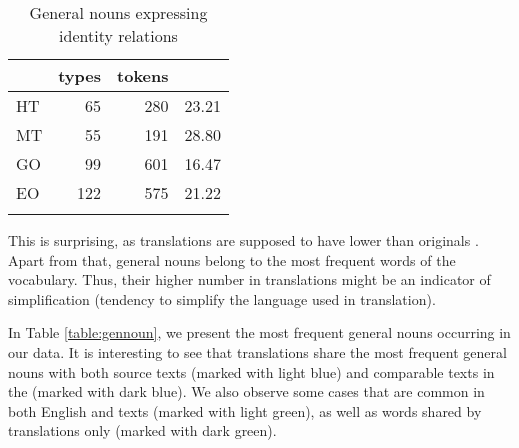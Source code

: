 \documentclass[output=paper]{langsci/langscibook.cls}
\begin{document}
\begin{table}
\begin{tabular}{lrrr}
\lsptoprule
	&	types&tokens&\isi{TTR}\\
\midrule
HT & 65  & 280 & 23.21\\
MT & 55    & 191 & 28.80\\
GO & 99  & 601 & 16.47\\
EO & 122 & 575 & 21.22\\
\lspbottomrule
\end{tabular}
\caption{General nouns expressing identity relations}
\label{table:ttrgennoun}
\end{table}

This is surprising, as translations are supposed to have lower  than originals \citep[as stated by][]{Croco2012}. Apart from that, general nouns belong to the most frequent words of the vocabulary. Thus, their higher number in translations might be an indicator of simplification (tendency to simplify the language used in translation).

In Table \ref{table:gennoun}, we present the most frequent general nouns occurring in our data. It is interesting to see that translations share the most frequent general nouns with both source texts 
(marked with light blue)
and comparable texts in the  
(marked with dark blue). 
We also observe some cases that are common in both English and  texts 
(marked with light green), 
as well as words shared by translations only 
(marked with dark green).

\newcommand{\colorone}{yellow}
\newcommand{\colortwo}{purple!30}
\newcommand{\colorthree}{brown!60}
\newcommand{\colorfour}{cyan!40} 
\end{document}
